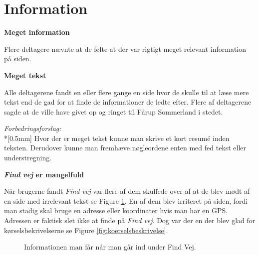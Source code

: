 \documentclass[10pt,a4paper]{article}      %
\newcommand{\kommentar}[2]{\item[#1] \textbf{#2}\par\nopagebreak}{}
\newenvironment{forslag}{\emph{Forbedringsforslag:}\\*[0.5mm]}{}
\newcommand\pic[1]{\texttt{[image: Pics/\#1]}}
\renewcommand\good{\pic{good}}
\renewcommand\smallproblem{\pic{smallproblem}}
\renewcommand\seriousproblem{\pic{seriousproblem}}
\begin{document}
\section{Information}

\begin{kommentarer}


\kommentar{\good}{Meget information}

Flere deltagere nævnte at de følte at der var rigtigt meget relevant information på siden.

\kommentar{\seriousproblem}{Meget tekst}

Alle deltagerene fandt en eller flere gange en side hvor de skulle til at læse
mere tekst end de gad for at finde de informationer de ledte efter. Flere af
deltagerene sagde at de ville have givet op og ringet til Fårup Sommerland i
stedet.

\begin{forslag}
Hvor der er meget tekst kunne man skrive et kort resumé inden teksten. Derudover kunne man fremhæve nøgleordene enten med fed tekst eller understregning. 
\end{forslag}

\kommentar{\smallproblem}{\emph{Find vej} er mangelfuld}

Når brugerne fandt \emph{Find vej} var flere af dem skuffede over af at de
blev mødt af en side med irrelevant tekst se Figure \ref{fig:findvej}. En af
dem blev irriteret på siden, fordi man stadig skal bruge en adresse eller
koordinater hvis man har en GPS. Adressen er faktisk slet ikke at finde på 
\emph{Find vej}. Dog var der en der blev glad for kørselsbekrivelserne se
Figure \ref{fig:koerselsbeskrivelse}.

\begin{figure}[htbp]
    \centering
    \caption{Informationen man får når man går ind under Find Vej.}
    \label{fig:findvej}
\end{figure}


\end{kommentarer}
\end{document}
